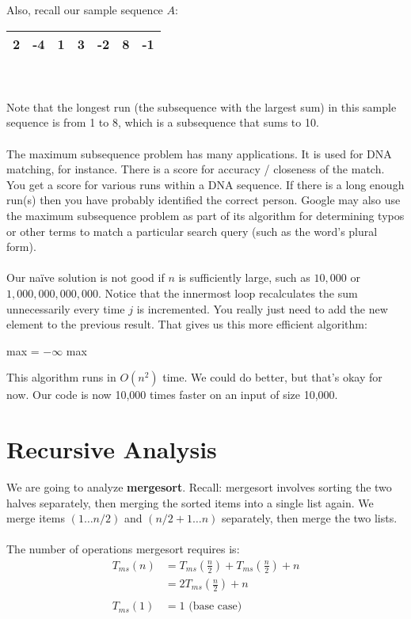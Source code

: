 \documentclass[]{article}
\theoremstyle{definition}
\begin{document}
			Also, recall our sample sequence $A$:
			\begin{tabular}{|c|c|c|c|c|c|c|}
				\hline 2 & -4 & 1 & 3 & -2 & 8 & -1 \\ \hline
			\end{tabular}
			\\ \\	
			Note that the longest run (the subsequence with the largest sum) in this sample sequence is from 1 to 8, which is a subsequence that sums to 10.
			\\ \\
			The maximum subsequence problem has many applications. It is used for DNA matching, for instance. There is a score for accuracy / closeness of the match. You get a score for various runs within a DNA sequence. If there is a long enough run(s) then you have probably identified the correct person. Google may also use the maximum subsequence problem as part of its algorithm for determining typos or other terms to match a particular search query (such as the word's plural form).
			\\ \\
			Our na\"ive solution is not good if $n$ is sufficiently large, such as $10,000$ or $1,000,000,000,000$. Notice that the innermost loop recalculates the sum unnecessarily every time $j$ is incremented. You really just need to add the new element to the previous result. That gives us this more efficient algorithm: \\
			\begin{algorithm}[H]
				max = $-\infty$\;
				\Return max
			\end{algorithm}

			This algorithm runs in $O(n^2)$ time. We could do better, but that's okay for now. Our code is now 10,000 times faster on an input of size 10,000.
	\section{Recursive Analysis}
		We are going to analyze \textbf{mergesort}. Recall: mergesort involves sorting the two halves separately, then merging the sorted items into a single list again. We merge items $(1 \ldots n/2)$ and $(n/2 + 1 \ldots n)$ separately, then merge the two lists.
		\\ \\
		The number of operations mergesort requires is:
		\begin{align*}
			T_{ms}(n) &= T_{ms}\left( \frac{n}{2} \right) + T_{ms}\left( \frac{n}{2} \right) + n \\
			&= 2T_{ms}\left( \frac{n}{2} \right) + n
			\\ \\
			T_{ms}(1) &= 1 \text{ (base case)}
		\end{align*}
		
\end{document}
